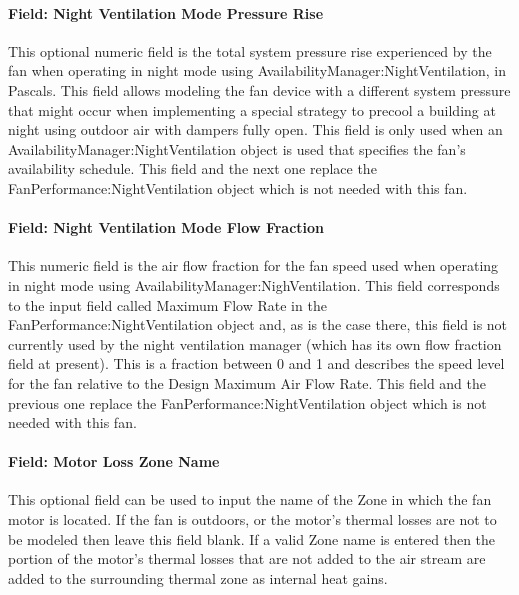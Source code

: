 \paragraph{Field: Night Ventilation Mode Pressure Rise}\label{field-nite-vent-pressure-fansysmodel}

This optional numeric field is the total system pressure rise experienced by the fan when operating in night mode using AvailabilityManager:NightVentilation, in Pascals.  This field allows modeling the fan device with a different system pressure that might occur when implementing a special strategy to precool a building at night using outdoor air with dampers fully open.  This field is only used when an AvailabilityManager:NightVentilation object is used that specifies the fan's availability schedule.  This field and the next one replace the FanPerformance:NightVentilation object which is not needed with this fan.

\paragraph{Field: Night Ventilation Mode Flow Fraction}\label{field-nite-vent-flow-fraction-fansysmodel}

This numeric field is the air flow fraction for the fan speed used when operating in night mode using AvailabilityManager:NighVentilation.  This field corresponds to the input field called Maximum Flow Rate in the FanPerformance:NightVentilation object and, as is the case there, this field is not currently used by the night ventilation manager (which has its own flow fraction field at present).  This is a fraction between 0 and 1 and describes the speed level for the fan relative to the Design Maximum Air Flow Rate.  This field and the previous one replace the FanPerformance:NightVentilation object which is not needed with this fan.

\paragraph{Field: Motor Loss Zone Name}\label{field-loss-zone-name-fansysmodel}

This optional field can be used to input the name of the Zone in which the fan motor is located.  If the fan is outdoors, or the motor's thermal losses are not to be modeled then leave this field blank.  If a valid Zone name is entered then the portion of the motor's thermal losses that are not added to the air stream are added to the surrounding thermal zone as internal heat gains.

